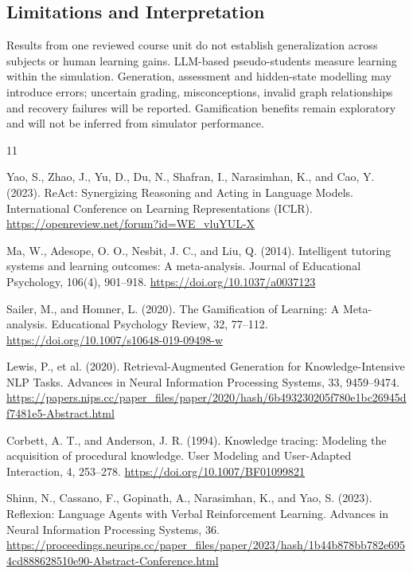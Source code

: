 \documentclass{article}
\begin{document}
\subsection{Limitations and Interpretation}

Results from one reviewed course unit do not establish generalization across subjects or human learning gains. LLM-based pseudo-students measure learning within the simulation. Generation, assessment and hidden-state modelling may introduce errors; uncertain grading, misconceptions, invalid graph relationships and recovery failures will be reported. Gamification benefits remain exploratory and will not be inferred from simulator performance.

\clearpage

\begin{thebibliography}{11}
\raggedright

 Yao, S., Zhao, J., Yu, D., Du, N., Shafran, I., Narasimhan, K., and Cao, Y. (2023). ReAct: Synergizing Reasoning and Acting in Language Models. International Conference on Learning Representations (ICLR). \url{https://openreview.net/forum?id=WE_vluYUL-X}

 Ma, W., Adesope, O. O., Nesbit, J. C., and Liu, Q. (2014). Intelligent tutoring systems and learning outcomes: A meta-analysis. Journal of Educational Psychology, 106(4), 901--918. \url{https://doi.org/10.1037/a0037123}

 Sailer, M., and Homner, L. (2020). The Gamification of Learning: A Meta-analysis. Educational Psychology Review, 32, 77--112. \url{https://doi.org/10.1007/s10648-019-09498-w}

 Lewis, P., et al. (2020). Retrieval-Augmented Generation for Knowledge-Intensive NLP Tasks. Advances in Neural Information Processing Systems, 33, 9459--9474. \url{https://papers.nips.cc/paper_files/paper/2020/hash/6b493230205f780e1bc26945df7481e5-Abstract.html}

 Corbett, A. T., and Anderson, J. R. (1994). Knowledge tracing: Modeling the acquisition of procedural knowledge. User Modeling and User-Adapted Interaction, 4, 253--278. \url{https://doi.org/10.1007/BF01099821}

 Shinn, N., Cassano, F., Gopinath, A., Narasimhan, K., and Yao, S. (2023). Reflexion: Language Agents with Verbal Reinforcement Learning. Advances in Neural Information Processing Systems, 36. \url{https://proceedings.neurips.cc/paper_files/paper/2023/hash/1b44b878bb782e6954cd888628510e90-Abstract-Conference.html}


\end{thebibliography}
\end{document}
